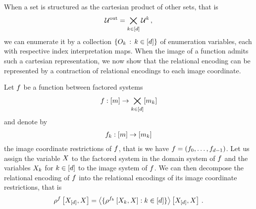 
When a set is structured as the cartesian product of other sets, that is
\begin{align*}
    \mathcal{U}^{\mathrm{out}} = \bigtimes_{k\in[d]} \mathcal{U}^{k} \, ,
\end{align*}
we can enumerate it by a collection $\{O_{k} \, : \, k\in[d]\}$ of enumeration variables, each with respective index interpretation maps.
When the image of a function admits such a cartesian representation, we now show that the relational encoding can be represented by a contraction of relational encodings to each image coordinate.

\begin{theorem}
    \label{the:functionImageDecompositionContraction}
    Let $f$ be a function between factored systems
    \begin{align*}
        f : [m] \rightarrow  \bigtimes_{k\in[d]}[m_{k}]
    \end{align*}
    and denote by
    \begin{align*}
        f_{k} : [m] \rightarrow [m_{k}]
    \end{align*}
    the image coordinate restrictions of $f$, that is we have $f=(f_{0},\ldots,f_{d-1})$.
    Let us assign the variable $X$ to the factored system in the domain system of $f$ and the variables $X_{k}$ for $k\in[d]$ to the image system of $f$.
    We can then decompose the relational encoding of $f$ into the relational encodings of its image coordinate restrictions, that is
    \begin{align*}
        \rho^{f}\left[X_{[d]},X\right]
        = \left\langle 
            \{\rho^{f_{k}}\left[X_{k},X\right] : k\in[d] \}
        \right\rangle \left[ X_{[d]},X \right] \, .
    \end{align*}
\end{theorem}
